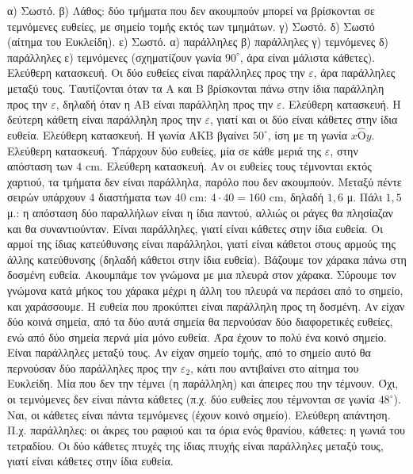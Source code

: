 α) Σωστό. β) Λάθος: δύο τμήματα που δεν ακουμπούν μπορεί να βρίσκονται σε τεμνόμενες ευθείες, με σημείο τομής εκτός των τμημάτων. γ) Σωστό. δ) Σωστό (αίτημα του Ευκλείδη). ε) Σωστό.
 α) παράλληλες \quad β) παράλληλες \quad γ) τεμνόμενες \quad δ) παράλληλες \quad ε) τεμνόμενες (σχηματίζουν γωνία $90^\circ$, άρα είναι μάλιστα κάθετες).
 Ελεύθερη κατασκευή. Οι δύο ευθείες είναι παράλληλες προς την $\varepsilon$, άρα παράλληλες μεταξύ τους. Ταυτίζονται όταν τα $\mathrm{Α}$ και $\mathrm{Β}$ βρίσκονται πάνω στην ίδια παράλληλη προς την $\varepsilon$, δηλαδή όταν η $\mathrm{ΑΒ}$ είναι παράλληλη προς την $\varepsilon$.
 Ελεύθερη κατασκευή. Η δεύτερη κάθετη είναι παράλληλη προς την $\varepsilon$, γιατί και οι δύο είναι κάθετες στην ίδια ευθεία.
 Ελεύθερη κατασκευή. Η γωνία $\mathrm{ΑΚΒ}$ βγαίνει $50^\circ$, ίση με τη γωνία $x\hat{\mathrm{Ο}}y$.
 Ελεύθερη κατασκευή. Υπάρχουν δύο ευθείες, μία σε κάθε μεριά της $\varepsilon$, στην απόσταση των $4$ cm.
 Ελεύθερη κατασκευή. Αν οι ευθείες τους τέμνονται εκτός χαρτιού, τα τμήματα δεν είναι παράλληλα, παρόλο που δεν ακουμπούν.
 Μεταξύ πέντε σειρών υπάρχουν $4$ διαστήματα των $40$ cm: $4\cdot40=160$ cm, δηλαδή $1{,}6$ μ.
 Πάλι $1{,}5$ μ.: η απόσταση δύο παραλλήλων είναι η ίδια παντού, αλλιώς οι ράγες θα πλησίαζαν και θα συναντιούνταν.
 Είναι παράλληλες, γιατί είναι κάθετες στην ίδια ευθεία.
 Οι αρμοί της ίδιας κατεύθυνσης είναι παράλληλοι, γιατί είναι κάθετοι στους αρμούς της άλλης κατεύθυνσης (δηλαδή κάθετοι στην ίδια ευθεία).
 Βάζουμε τον χάρακα πάνω στη δοσμένη ευθεία. Ακουμπάμε τον γνώμονα με μια πλευρά στον χάρακα. Σύρουμε τον γνώμονα κατά μήκος του χάρακα μέχρι η άλλη του πλευρά να περάσει από το σημείο, και χαράσσουμε. Η ευθεία που προκύπτει είναι παράλληλη προς τη δοσμένη.
 Αν είχαν δύο κοινά σημεία, από τα δύο αυτά σημεία θα περνούσαν δύο διαφορετικές ευθείες, ενώ από δύο σημεία περνά μία μόνο ευθεία. Άρα έχουν το πολύ ένα κοινό σημείο.
 Είναι παράλληλες μεταξύ τους. Αν είχαν σημείο τομής, από το σημείο αυτό θα περνούσαν δύο παράλληλες προς την $\varepsilon_2$, κάτι που αντιβαίνει στο αίτημα του Ευκλείδη.
 Μία που δεν την τέμνει (η παράλληλη) και άπειρες που την τέμνουν.
 Όχι, οι τεμνόμενες δεν είναι πάντα κάθετες (π.χ. δύο ευθείες που τέμνονται σε γωνία $48^\circ$). Ναι, οι κάθετες είναι πάντα τεμνόμενες (έχουν κοινό σημείο).
 Ελεύθερη απάντηση. Π.χ. παράλληλες: οι άκρες του ραφιού και τα όρια ενός θρανίου, κάθετες: η γωνιά του τετραδίου.
 Οι δύο κάθετες πτυχές της ίδιας πτυχής είναι παράλληλες μεταξύ τους, γιατί είναι κάθετες στην ίδια ευθεία.
